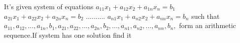 It's given system of equations
$a_{11}x_1+a_{12}x_2+a_{1n}x_n=b_1$
$a_{21}x_1+a_{22}x_2+a_{2n}x_n=b_2$
..........
$a_{n1}x_1+a_{n2}x_2+a_{nn}x_n=b_n$
such that $a_{11},a_{12},...,a_{1n},b_1,a_{21},a_{22},...,a_{2n},b_2,...,a_{n1},a_{n2},...,a_{nn},b_n,$ form an arithmetic sequence.If system has one solution find it